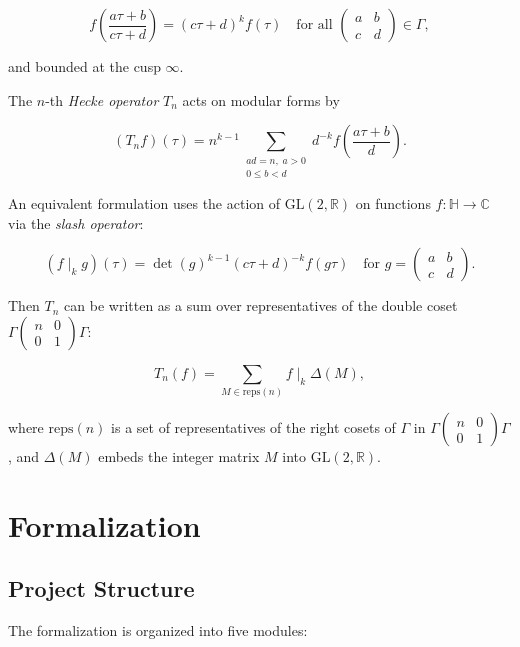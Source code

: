 \documentclass[11pt]{article}
\theoremstyle{plain}
\theoremstyle{definition}
\theoremstyle{remark}
\begin{document}
\[
f\left(\frac{a\tau+b}{c\tau+d}\right) = (c\tau+d)^k f(\tau) \quad\text{for all } \begin{pmatrix}a&b\\c&d\end{pmatrix}\in\Gamma,
\]

and bounded at the cusp $\infty$.

The $n$-th \emph{Hecke operator} $T_n$ acts on modular forms by

\[
(T_n f)(\tau) = n^{k-1}\sum_{\substack{ad=n,\; a>0\\0\leq b<d}} d^{-k} f\left(\frac{a\tau+b}{d}\right).
\]

An equivalent formulation uses the action of $\mathrm{GL}(2,\mathbb{R})$ on functions $f:\mathbb{H}\to\mathbb{C}$ via the \emph{slash operator}:

\[
(f\mid_k g)(\tau) = \det(g)^{k-1} (c\tau+d)^{-k} f(g\tau) \quad\text{for } g=\begin{pmatrix}a&b\\c&d\end{pmatrix}.
\]

Then $T_n$ can be written as a sum over representatives of the double coset $\Gamma\begin{pmatrix}n&0\\0&1\end{pmatrix}\Gamma$:

\[
T_n(f) = \sum_{M\in\mathrm{reps}(n)} f\mid_k \Delta(M),
\]

where $\mathrm{reps}(n)$ is a set of representatives of the right cosets of $\Gamma$ in $\Gamma\begin{pmatrix}n&0\\0&1\end{pmatrix}\Gamma$, and $\Delta(M)$ embeds the integer matrix $M$ into $\mathrm{GL}(2,\mathbb{R})$.

\section{Formalization}
\label{sec:formalization}

\subsection{Project Structure}

The formalization is organized into five modules:
\end{document}
